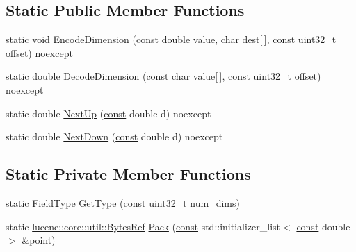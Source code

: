 \subsection*{Static Public Member Functions}
\begin{DoxyCompactItemize}
\item 
static void \mbox{\hyperlink{classlucene_1_1core_1_1document_1_1DoublePoint_a633e37e3ec07561f1af51e0215069cc5}{Encode\+Dimension}} (\mbox{\hyperlink{ZlibCrc32_8h_a2c212835823e3c54a8ab6d95c652660e}{const}} double value, char dest\mbox{[}$\,$\mbox{]}, \mbox{\hyperlink{ZlibCrc32_8h_a2c212835823e3c54a8ab6d95c652660e}{const}} uint32\+\_\+t offset) noexcept
\item 
static double \mbox{\hyperlink{classlucene_1_1core_1_1document_1_1DoublePoint_abffe80eb3bb0bf46daceaff952a669b9}{Decode\+Dimension}} (\mbox{\hyperlink{ZlibCrc32_8h_a2c212835823e3c54a8ab6d95c652660e}{const}} char value\mbox{[}$\,$\mbox{]}, \mbox{\hyperlink{ZlibCrc32_8h_a2c212835823e3c54a8ab6d95c652660e}{const}} uint32\+\_\+t offset) noexcept
\item 
static double \mbox{\hyperlink{classlucene_1_1core_1_1document_1_1DoublePoint_a1528aa543245510f6643c7432fcf3a9a}{Next\+Up}} (\mbox{\hyperlink{ZlibCrc32_8h_a2c212835823e3c54a8ab6d95c652660e}{const}} double d) noexcept
\item 
static double \mbox{\hyperlink{classlucene_1_1core_1_1document_1_1DoublePoint_ad8b9a18e61d743166d762e2f82b2deb1}{Next\+Down}} (\mbox{\hyperlink{ZlibCrc32_8h_a2c212835823e3c54a8ab6d95c652660e}{const}} double d) noexcept
\end{DoxyCompactItemize}
\subsection*{Static Private Member Functions}
\begin{DoxyCompactItemize}
\item 
static \mbox{\hyperlink{classlucene_1_1core_1_1document_1_1FieldType}{Field\+Type}} \mbox{\hyperlink{classlucene_1_1core_1_1document_1_1DoublePoint_ae6d734636e6e1c80f0ffd28443e62c08}{Get\+Type}} (\mbox{\hyperlink{ZlibCrc32_8h_a2c212835823e3c54a8ab6d95c652660e}{const}} uint32\+\_\+t num\+\_\+dims)
\item 
static \mbox{\hyperlink{classlucene_1_1core_1_1util_1_1BytesRef}{lucene\+::core\+::util\+::\+Bytes\+Ref}} \mbox{\hyperlink{classlucene_1_1core_1_1document_1_1DoublePoint_a9ad090bc4fec578601b40f974302f60f}{Pack}} (\mbox{\hyperlink{ZlibCrc32_8h_a2c212835823e3c54a8ab6d95c652660e}{const}} std\+::initializer\+\_\+list$<$ \mbox{\hyperlink{ZlibCrc32_8h_a2c212835823e3c54a8ab6d95c652660e}{const}} double $>$ \&point)
\end{DoxyCompactItemize}
